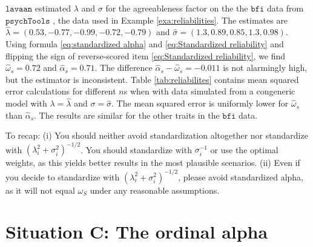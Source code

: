\documentclass[twoside]{article}
\begin{document}
\begin{example}
%
$\mathtt{lavaan}$ estimated $\lambda$ and $\sigma$ for the agreeableness factor on the the $\texttt{bfi}$ data from $\texttt{psychTools}$ \citep{Revelle2019-te}, the data used in Example \ref{exa:reliabilities}. The estimates are $\hat{\lambda} = (0.53, -0.77, -0.99, -0.72, -0.79)$ and $\hat{\sigma} = (1.3, 0.89, 0.85, 1.3, 0.98)$. Using formula \eqref{eq:standardized alpha} and \eqref{eq:Standardized reliability} and flipping the sign of reverse-scored item \eqref{eq:Standardized reliability}, we find $\hat{\omega}_s = 0.72$ and $\hat{\alpha}_s = 0.71$. The difference $\hat{\alpha}_s - \hat{\omega}_s = -0.011$ is not alarmingly high, but the estimator is inconsistent. Table \ref{tab:reliabilites} contains mean squared error calculations for different $n$s when with data simulated from a congeneric model with $\lambda=\hat{\lambda}$ and $\sigma = \hat{\sigma}$. The mean squared error is uniformly lower for $\hat{\omega}_s$ than $\hat{\alpha}_s$. The results are similar for the other traits in the $\texttt{bfi}$ data.
\end{example}

To recap: (i) You should neither avoid standardization altogether nor standardize with $(\lambda_{i}^{2}+\sigma_{i}^{2})^{-1/2}$. You should standardize with $\sigma_i^{-1}$ or use the optimal weights, as this yields better results in the most plausible scenarios. (ii) Even if you decide to standardize with $(\lambda_{i}^{2}+\sigma_{i}^{2})^{-1/2}$, please avoid standardized alpha, as it will not equal $\omega_S$ under any reasonable assumptions.

\section{Situation C: The ordinal alpha \label{sec:Ordinal alpha}}
\end{document}
